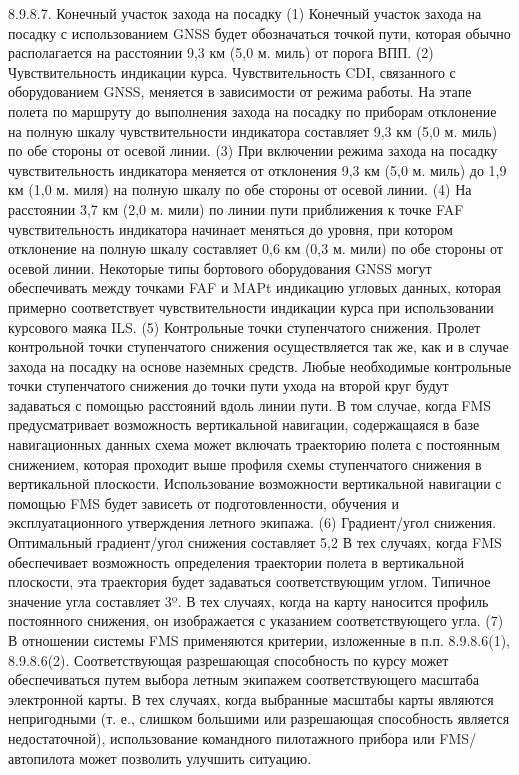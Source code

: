 8.9.8.7.	Конечный участок захода на посадку
(1) Конечный участок захода на посадку с использованием GNSS будет обозначаться точкой пути, которая обычно располагается на расстоянии 9,3 км (5,0 м. миль) от порога ВПП.
(2) Чувствительность индикации курса. 
Чувствительность CDI, связанного с оборудованием GNSS, меняется в зависимости от режима работы. На этапе полета по маршруту до выполнения захода на посадку по приборам отклонение на полную шкалу чувствительности индикатора составляет 9,3 км (5,0 м. миль) по обе стороны от осевой линии.
(3) При включении режима захода на посадку чувствительность индикатора меняется от отклонения 9,3 км (5,0 м. миль) до 1,9 км (1,0 м. миля) на полную шкалу по обе стороны от осевой линии.
(4) На расстоянии 3,7 км (2,0 м. мили) по линии пути приближения к точке FAF чувствительность индикатора начинает меняться до уровня, при котором отклонение на полную шкалу составляет 0,6 км (0,3 м. мили) по обе стороны от осевой линии. Некоторые типы бортового оборудования GNSS могут обеспечивать между точками FAF и MAPt индикацию угловых данных, которая примерно соответствует чувствительности индикации курса при использовании курсового маяка ILS.
(5) Контрольные точки ступенчатого снижения. 
Пролет контрольной точки ступенчатого снижения осуществляется так же, как и в случае захода на посадку на основе наземных средств. Любые необходимые контрольные точки ступенчатого снижения до точки пути ухода на второй круг будут задаваться с помощью расстояний вдоль линии пути. 
В том случае, когда FMS предусматривает возможность вертикальной навигации, содержащаяся в базе навигационных данных схема может включать траекторию полета с постоянным снижением, которая проходит выше профиля схемы ступенчатого снижения в вертикальной плоскости. Использование возможности вертикальной навигации с помощью FMS будет зависеть от подготовленности, обучения и эксплуатационного утверждения летного экипажа.
(6) Градиент/угол снижения. 
Оптимальный градиент/угол снижения составляет 5,2%
В тех случаях, когда FMS обеспечивает возможность определения траектории полета в вертикальной плоскости, эта траектория будет задаваться соответствующим углом. Типичное значение угла составляет 3º. В тех случаях, когда на карту наносится профиль постоянного снижения, он изображается с указанием соответствующего угла.
(7) В отношении системы FMS применяются критерии, изложенные в п.п. 8.9.8.6(1), 8.9.8.6(2). Соответствующая разрешающая способность по курсу может обеспечиваться путем выбора летным экипажем соответствующего масштаба электронной карты. В тех случаях, когда выбранные масштабы карты являются непригодными (т. е., слишком большими или разрешающая способность является недостаточной), использование командного пилотажного прибора или FMS/автопилота может позволить улучшить ситуацию.
